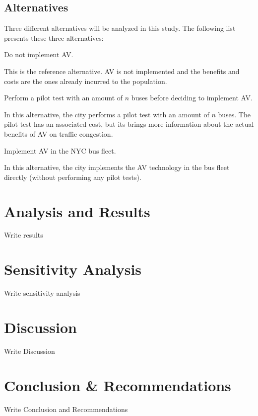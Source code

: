 \documentclass[11pt, letterpaper]{article}
\begin{document}
\subsection{Alternatives}

Three different alternatives will be analyzed in this study. The following list presents these three alternatives:

\begin{description}[leftmargin=0pt]
\item[Alternative 1:] Do not implement AV.

This is the reference alternative. AV is not implemented and the benefits and costs are the ones already incurred to the population.

\item[Alternative 2:] Perform a pilot test with an amount of $n$ buses before deciding to implement AV.

In this alternative, the city performs a pilot test with an amount of $n$ buses. The pilot test has an associated cost, but its brings more information about the actual benefits of AV on traffic congestion. 

\item[Alternative 3:] Implement AV in the NYC bus fleet.

In this alternative, the city implements the AV technology in the bus fleet directly (without performing any pilot tests).

\end{description}



\section{Analysis and Results} \label{results}

Write results

\section{Sensitivity Analysis} \label{sensitivity}

Write sensitivity analysis

\section{Discussion} \label{discussion}

Write Discussion

\section{Conclusion \& Recommendations} \label{conclusion}

Write Conclusion and Recommendations
\end{document}

